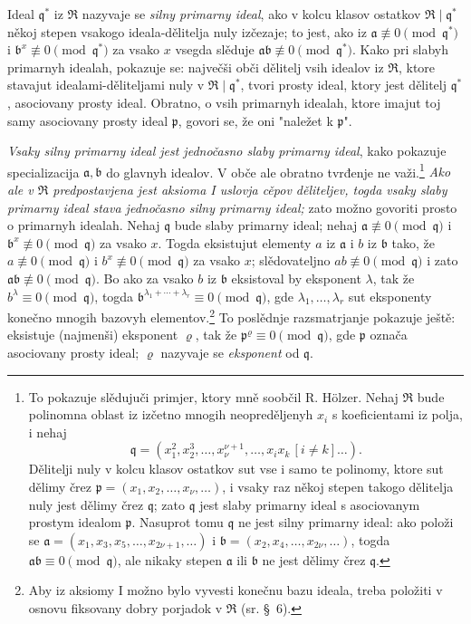 \documentclass[11pt]{article}
\providecommand{\mR}{\mathfrak{R}}
\providecommand{\ma}{\mathfrak{a}}
\providecommand{\mb}{\mathfrak{b}}
\providecommand{\mq}{\mathfrak{q}}
\providecommand{\mpideal}{\mathfrak{p}}
\begin{document}
Ideal $\mq^*$ iz $\mR$ nazyvaje se \emph{silny primarny ideal}, ako v kolcu klasov ostatkov $\mR\mid\mq^*$ někoj stepen vsakogo ideala-dělitelja nuly izčezaje; to jest, ako iz $\ma\not\equiv0\pmod{\mq^*}$ i $\mb^x\not\equiv0\pmod{\mq^*}$ za vsako $x$ vsegda slěduje $\ma\mb\not\equiv0\pmod{\mq^*}$. Kako pri slabyh primarnyh idealah, pokazuje se: največši obči dělitelj vsih idealov iz $\mR$, ktore stavajut idealami-děliteljami nuly v $\mR\mid\mq^*$, tvori prosty ideal, ktory jest dělitelj $\mq^*$, asociovany prosty ideal. Obratno, o vsih primarnyh idealah, ktore imajut toj samy asociovany prosty ideal $\mpideal$, govori se, že oni "naležet k $\mpideal$".

\emph{Vsaky silny primarny ideal jest jednočasno slaby primarny ideal}, kako pokazuje specializacija $\ma,\mb$ do glavnyh idealov. V obče ale obratno tvrđenje ne važi.\footnote{To pokazuje slědujuči primjer, ktory mně soobčil R. Hölzer. Nehaj $\mR$ bude polinomna oblast iz izčetno mnogih neopreděljenyh $x_i$ s koeficientami iz polja, i nehaj
\[
\mq=(x_1^2,x_2^3,\ldots,x_\nu^{\nu+1},\ldots,x_i x_k\,[i\ne k]\ldots).
\]
Dělitelji nuly v kolcu klasov ostatkov sut vse i samo te polinomy, ktore sut dělimy črez $\mpideal=(x_1,x_2,\ldots,x_\nu,\ldots)$, i vsaky raz někoj stepen takogo dělitelja nuly jest dělimy črez $\mq$; zato $\mq$ jest slaby primarny ideal s asociovanym prostym idealom $\mpideal$. Nasuprot tomu $\mq$ ne jest silny primarny ideal: ako položi se $\ma=(x_1,x_3,x_5,\ldots,x_{2\nu+1},\ldots)$ i $\mb=(x_2,x_4,\ldots,x_{2\nu},\ldots)$, togda $\ma\mb\equiv0\pmod{\mq}$, ale nikaky stepen $\ma$ ili $\mb$ ne jest dělimy črez $\mq$.} \emph{Ako ale v $\mR$ predpostavjena jest aksioma I uslovja cěpov děliteljev, togda vsaky slaby primarny ideal stava jednočasno silny primarny ideal;} zato možno govoriti prosto o primarnyh idealah. Nehaj $\mq$ bude slaby primarny ideal; nehaj $\ma\not\equiv0\pmod{\mq}$ i $\mb^x\not\equiv0\pmod{\mq}$ za vsako $x$. Togda eksistujut elementy $a$ iz $\ma$ i $b$ iz $\mb$ tako, že $a\not\equiv0\pmod{\mq}$ i $b^x\not\equiv0\pmod{\mq}$ za vsako $x$; slědovateljno $ab\not\equiv0\pmod{\mq}$ i zato $\ma\mb\not\equiv0\pmod{\mq}$. Bo ako za vsako $b$ iz $\mb$ eksistoval by eksponent $\lambda$, tak že $b^\lambda\equiv0\pmod{\mq}$, togda $\mb^{\lambda_1+\cdots+\lambda_r}\equiv0\pmod{\mq}$, gde $\lambda_1,\ldots,\lambda_r$ sut eksponenty konečno mnogih bazovyh elementov.\footnote{Aby iz aksiomy I možno bylo vyvesti konečnu bazu ideala, treba položiti v osnovu fiksovany dobry porjadok v $\mR$ (sr. \S~6).} To poslědnje razsmatrjanje pokazuje ještě: eksistuje (najmenši) eksponent $\varrho$, tak že $\mpideal^\varrho\equiv0\pmod{\mq}$, gde $\mpideal$ označa asociovany prosty ideal; $\varrho$ nazyvaje se \emph{eksponent} od $\mq$.
\end{document}
